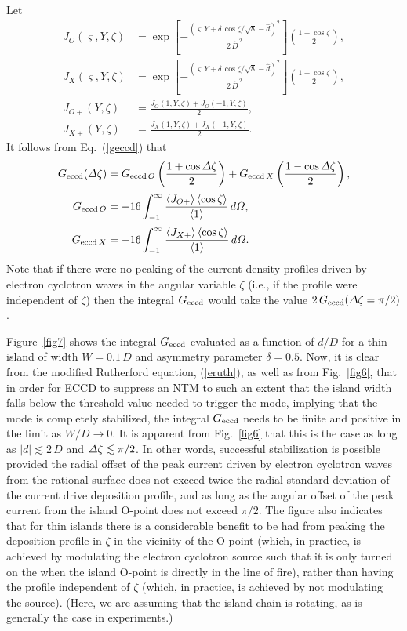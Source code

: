 \documentclass[12pt,prb,aps]{revtex4-1}
\begin{document}
Let 
\begin{align}
J_O(\varsigma,Y,\zeta) &=  \exp\!\left[-\frac{(\varsigma\,Y+\delta\,\cos\zeta/\sqrt{8}-\hat{d})^2}{2\,\hat{D}^{\,2}}\right]\left(\frac{1+\cos\zeta}{2}\right),\\[0.5ex]
J_X(\varsigma,Y,\zeta) &=  \exp\!\left[-\frac{(\varsigma\,Y+\delta\,\cos\zeta/\sqrt{8}-\hat{d})^2}{2\,\hat{D}^{\,2}}\right]\left(\frac{1-\cos\zeta}{2}\right),\\[0.5ex]
J_{O+}(Y,\zeta) &= \frac{J_O(1,Y,\zeta) + J_O(-1,Y,\zeta)}{2},\\[0.5ex]
J_{X+}(Y,\zeta) &= \frac{J_X(1,Y,\zeta) + J_X(-1,Y,\zeta)}{2}.
\end{align}
It follows from Eq.~(\ref{geccd}) that
\begin{align}
G_{\rm eccd}({\mit\Delta}\zeta)& = G_{{\rm eccd}\,O}\left(\frac{1+\cos{\mit\Delta}\zeta}{2}\right)+G_{{\rm eccd}\,X}\left(\frac{1-\cos{\mit\Delta}\zeta}{2}\right),\\[0.5ex]
G_{{\rm eccd}\,O} &= - 16\int_{-1}^\infty \frac{\langle J_{O+}\rangle\,\langle \cos\zeta\rangle}{\langle 1\rangle}\,d{\mit\Omega},\\[0.5ex]
G_{{\rm eccd}\,X} &= - 16\int_{-1}^\infty \frac{\langle J_{X+}\rangle\,\langle \cos\zeta\rangle}{\langle 1\rangle}\,d{\mit\Omega}.
\end{align}
Note that if there were no peaking of the current density profiles driven by electron cyclotron waves in the angular variable $\zeta$ (i.e., if the profile were
independent of $\zeta$) then the integral $G_{\rm eccd}$ would take the value  $2\,G_{\rm eccd}({\mit\Delta}\zeta= \pi/2)$.

Figure~\ref{fig7} shows the integral $G_{\rm eccd}$ evaluated as a function of $d/D$ for a thin island of width $W=0.1\,D$ and asymmetry parameter
$\delta=0.5$. Now, it is clear from the modified Rutherford equation, (\ref{eruth}), as well as from  Fig.~\ref{fig6}, that in order for ECCD to suppress an NTM to
such an extent that the island width falls below the threshold value needed to trigger the mode, implying that the mode is completely
stabilized, the integral $G_{\rm eccd}$ needs to be finite and positive in the limit as $W/D\rightarrow 0$. It is apparent  from Fig.~\ref{fig6} that this is the case
as long as $|d|\lesssim 2\,D$ and ${\mit\Delta}\zeta\lesssim \pi/2$. In other words, successful stabilization is possible provided  the radial
offset of the peak current driven by electron cyclotron waves from the rational surface does not exceed twice the radial standard deviation of the current drive deposition profile, 
and as long as the angular offset of the peak current from the island O-point does not exceed $\pi/2$. The figure also indicates that for thin islands
there is a considerable benefit to be had from peaking the deposition profile in $\zeta$ in the vicinity of the O-point (which, in practice, is achieved by
modulating the electron cyclotron source such that it is only turned on the when the island O-point is directly in the line of fire), rather than having the profile independent of
$\zeta$ (which, in practice, is achieved by not modulating the source).\cite{ece6} (Here, we are assuming that the island chain is rotating, as is generally the case in experiments.) 
\end{document}
